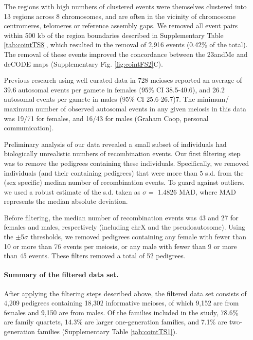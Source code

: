 The regions with high numbers of clustered events were themselves clustered
into 13 regions across 8 chromosomes, and are often in the vicinity of chromosome
centromeres, telomeres or reference assembly gaps. We removed all event pairs
within 500 kb of the region boundaries described in Supplementary Table \ref{tab:cointTS8}, which
resulted in the removal of 2,916 events (0.42\% of the total). The removal of these
events improved the concordance between the 23andMe and deCODE maps
(Supplementary Fig. \ref{fig:cointFS2}C).

Previous research using well-curated data in 728 meioses reported an average of
39.6 autosomal events per gamete in females (95\% CI 38.5-40.6), and 26.2
autosomal events per gamete in males (95\% CI 25.6-26.7)7. The minimum/
maximum number of observed autosomal events in any given meiosis in this
data was 19/71 for females, and 16/43 for males (Graham Coop, personal
communication).

Preliminary analysis of our data revealed a small subset of individuals had
biologically unrealistic numbers of recombination events. Our first filtering step
was to remove the pedigrees containing these individuals. Specifically, we removed
individuals (and their containing pedigrees) that were more than 5 s.d. from the
(sex specific) median number of recombination events. To guard against outliers,
we used a robust estimate of the s.d. taken as $\sigma=$ 1.4826 MAD, where MAD
represents the median absolute deviation.

Before filtering, the median number of recombination events was 43 and 27 for
females and males, respectively (including chrX and the pseudoautosome). Using
the $\pm$5$\sigma$ thresholds, we removed pedigrees containing any female with fewer than
10 or more than 76 events per meiosis, or any male with fewer than 9 or more than
45 events. These filters removed a total of 52 pedigrees.

\paragraph{Summary of the filtered data set.} After applying the filtering steps described
above, the filtered data set consists of 4,209 pedigrees containing 18,302
informative meioses, of which 9,152 are from females and 9,150 are from males.
Of the families included in the study, 78.6\% are family quartets, 14.3\% are larger
one-generation families, and 7.1\% are two-generation families (Supplementary
Table \ref{tab:cointTS1}).

